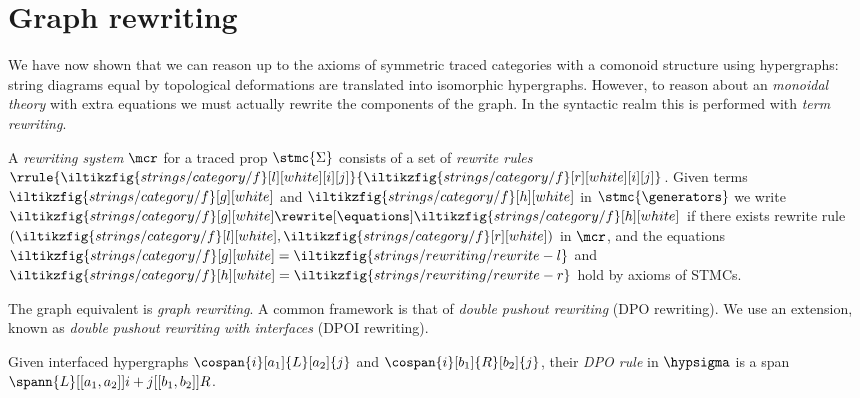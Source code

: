 \section{Graph rewriting}

We have now shown that we can reason up to the axioms of symmetric traced
categories with a comonoid structure using hypergraphs: string diagrams equal by
topological deformations are translated into isomorphic hypergraphs.
However, to reason about an \emph{monoidal theory} with extra equations we must
actually rewrite the components of the graph.
In the syntactic realm this is performed with \emph{term rewriting}.

\begin{definition}\label{def:term-rewriting}
    A \emph{rewriting system} \(\mcr\) for a traced prop \(\stmc{\Sigma}\)
    consists of a set of \emph{rewrite rules} \(
        \rrule{
            \iltikzfig{strings/category/f}[l][white][i][j]
        }{
            \iltikzfig{strings/category/f}[r][white][i][j]
        }
    \).
    Given terms \(
        \iltikzfig{strings/category/f}[g][white]
    \) and \(
        \iltikzfig{strings/category/f}[h][white]
    \) in \(\stmc{\generators}\) we write \(
        \iltikzfig{strings/category/f}[g][white]
        \rewrite[\equations]
        \iltikzfig{strings/category/f}[h][white]
    \) if there exists rewrite rule \((
        \iltikzfig{strings/category/f}[l][white],
        \iltikzfig{strings/category/f}[r][white]
    )\) in \(\mcr\), and the equations \(
        \iltikzfig{strings/category/f}[g][white]
        =
        \iltikzfig{strings/rewriting/rewrite-l}
    \) and \(
        \iltikzfig{strings/category/f}[h][white]
        =
        \iltikzfig{strings/rewriting/rewrite-r}
    \) hold by axioms of STMCs.
\end{definition}

The graph equivalent is \emph{graph rewriting}.
A common framework is that of \emph{double pushout rewriting} (DPO rewriting).
We use an extension, known as \emph{double pushout rewriting with interfaces}
(DPOI rewriting).

\begin{definition}
    Given interfaced hypergraphs \(
        \cospan{i}[a_1]{L}[a_2]{j}
    \) and \(
        \cospan{i}[b_1]{R}[b_2]{j}
    \), their \emph{DPO rule} in \(\hypsigma\) is a span \(
        \spann{L}[[a_1,a_2]]{i+j}[[b_1,b_2]]{R}
    \).
\end{definition}

